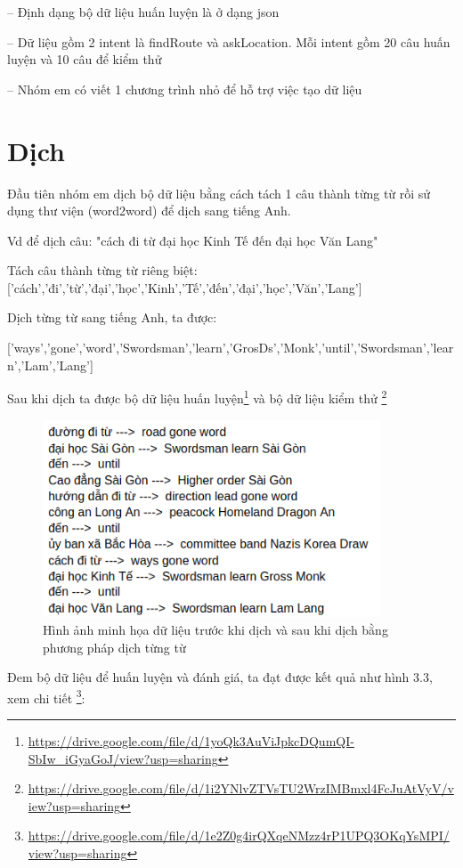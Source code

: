 -- Định dạng bộ dữ liệu huấn luyện là ở dạng json

-- Dữ liệu gồm 2 intent là findRoute và askLocation. Mỗi intent gồm 20 câu huấn luyện và 10 câu để kiểm thử

-- Nhóm em có viết 1 chương trình nhỏ để hỗ trợ việc tạo dữ liệu



\section{Dịch}

	Đầu tiên nhóm em dịch bộ dữ liệu bằng cách tách 1 câu thành từng từ rồi sử dụng thư viện (word2word) để dịch sang tiếng Anh.
	
	Vd để dịch câu: "cách đi từ đại học Kinh Tế đến đại học Văn Lang"
	
	Tách câu thành từng từ riêng biệt:
		['cách','đi','từ','đại','học','Kinh','Tế','đến','đại','học','Văn','Lang']
	
	Dịch từng từ sang tiếng Anh, ta được:
	
['ways','gone','word','Swordsman','learn','GrosDs','Monk','until','Swordsman','learn','Lam','Lang']
	
	Sau khi dịch ta được bộ dữ liệu huấn luyện\footnote{\url{https://drive.google.com/file/d/1yoQk3AuViJpkcDQumQI-SbIw_iGyaGoJ/view?usp=sharing}} và bộ dữ liệu kiểm thử \footnote{\url{https://drive.google.com/file/d/1i2YNlvZTVsTU2WrzIMBmxl4FcJuAtVyV/view?usp=sharing}}
	 \begin{figure}[htp]
              \centering
              \includegraphics[width=10cm]{images/trainingdata_dichtungtu.png} 
              \caption{Hình ảnh minh họa dữ liệu trước khi dịch và sau khi dịch bằng phương pháp dịch từng từ}
              \label{fig:sodohethongchiduong}

          \end{figure} 


	Đem bộ dữ liệu để huấn luyện và đánh giá, ta đạt được kết quả như hình 3.3, xem chi tiết \footnote{\url{https://drive.google.com/file/d/1e2Z0g4irQXqeNMzz4rP1UPQ3OKqYsMPI/view?usp=sharing}}: 


